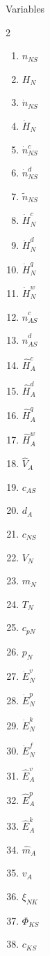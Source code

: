 \documentclass[10pt,a4paper]{report}
\begin{document}
	\Large{Variables}
	
	\begin{multicols}{2}
		\begin{enumerate}
			\item $n_{NS}$
			\item $H_N$			
			\item $\dot{n}_{NS}$
			\item $\dot{H}_N$
			\item $\dot{n}^{c}_{NS}$			
			\item $\dot{n}^{d}_{NS}$
			\item $\tilde{n}_{NS}$
			\item $\dot{H}^c_N$
			\item $\dot{H}^d_N$
			\item $\dot{H}^q_N$
			\item $\dot{H}^w_N$			
			\item $\hat{n}^{c}_{AS}$
			\item $\hat{n}^{d}_{AS}$
			\item $\hat{H}^c_A$
			\item $\hat{H}^d_A$
			\item $\hat{H}^q_A$
			\item $\hat{H}^w_A$			
			\item $\hat{V}_{A}$
			\item $c_{AS}$
			\item $d_A$
			\item $c_{NS}$
			\item $V_N$
			\item $m_N$
			\item $T_N$
			\item $c_{pN}$
			\item $p_N$
			\item $\dot{E}^{v}_N$
			\item $\dot{E}^{p}_N$
			\item $\dot{E}^{k}_N$
			\item $\dot{E}^{f}_N$
			\item $\hat{E}^{v}_{A}$
			\item $\hat{E}^{p}_{A}$
			\item $\hat{E}^{k}_{A}$
			\item $\hat{m}_A$
			\item $v_A$
			\item $\xi_{NK}$
			\item $\Phi_{KS}$
			\item $c_{KS}$
		\end{enumerate}

\end{multicols}
\end{document}
